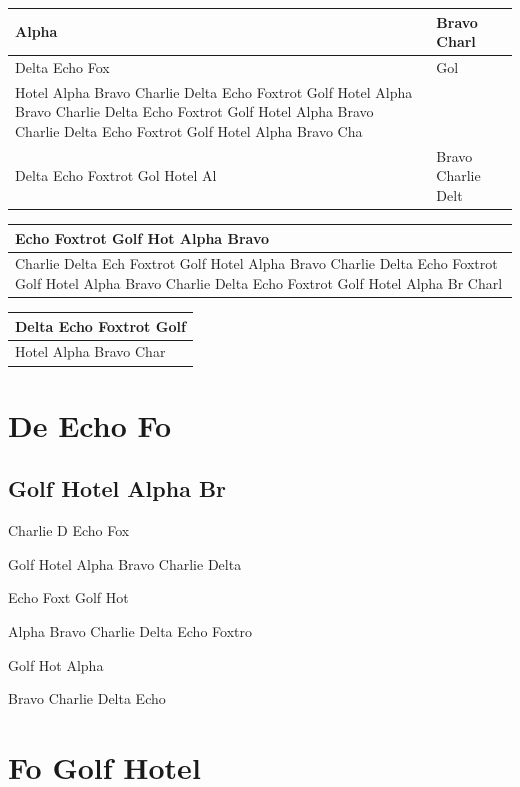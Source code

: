 \documentclass[11pt,a4paper]{article}
\begin{document}
\begin{table}[h]
\begin{tabular}{|l|l|}
\hline
Alpha  & Bravo Charl \\ \hline
Delta Echo Fox & Gol \\ \hline
Hotel Alpha  Bravo Charlie Delta Echo Foxtrot Golf Hotel Alpha Bravo Charlie  Delta Echo Foxtrot Golf Hotel Alpha Bravo Charlie Delta Echo Foxtrot Golf Hotel Alpha Bravo Cha &  \\ \hline
Delta Echo Foxtrot Gol  Hotel Al & Bravo Charlie Delt \\ \hline
\end{tabular}
\end{table}

\begin{table}[h]
\begin{tabular}{|l|}
\hline
Echo Foxtrot  Golf Hot  Alpha Bravo \\ \hline
Charlie Delta Ech  Foxtrot Golf Hotel Alpha Bravo Charlie Delta Echo Foxtrot Golf Hotel Alpha Bravo Charlie Delta Echo Foxtrot Golf Hotel Alpha Br  Charl \\ \hline
\end{tabular}
\end{table}

\begin{table}[h]
\begin{tabular}{|l|}
\hline
Delta Echo Foxtrot Golf \\ \hline
Hotel Alpha Bravo Char \\ \hline
\end{tabular}
\end{table}

\section{De	Echo Fo}

\subsection{Golf	Hotel Alpha Br}

Charlie D			Echo Fox

Golf Hotel Alpha Bravo Charlie Delta

Echo Foxt			Golf Hot

Alpha Bravo Charlie Delta Echo Foxtro

Golf Hot			Alpha

Bravo Charlie Delta Echo

\section{Fo	Golf Hotel}
\end{document}
